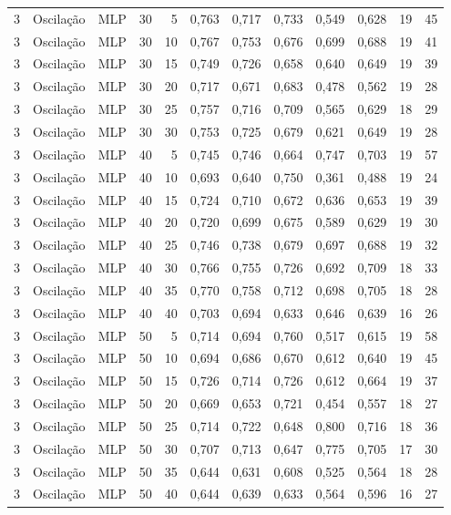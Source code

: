 \begin{longtable}{@{}rllrrrrrrrrr@{}}
3 & Oscilação & MLP & 30 & 5 & 0,763 & 0,717 & 0,733 & 0,549 & 0,628 & 19 & 45 \\
3 & Oscilação & MLP & 30 & 10 & 0,767 & 0,753 & 0,676 & 0,699 & 0,688 & 19 & 41 \\
3 & Oscilação & MLP & 30 & 15 & 0,749 & 0,726 & 0,658 & 0,640 & 0,649 & 19 & 39 \\
3 & Oscilação & MLP & 30 & 20 & 0,717 & 0,671 & 0,683 & 0,478 & 0,562 & 19 & 28 \\
3 & Oscilação & MLP & 30 & 25 & 0,757 & 0,716 & 0,709 & 0,565 & 0,629 & 18 & 29 \\
3 & Oscilação & MLP & 30 & 30 & 0,753 & 0,725 & 0,679 & 0,621 & 0,649 & 19 & 28 \\
3 & Oscilação & MLP & 40 & 5 & 0,745 & 0,746 & 0,664 & 0,747 & 0,703 & 19 & 57 \\
3 & Oscilação & MLP & 40 & 10 & 0,693 & 0,640 & 0,750 & 0,361 & 0,488 & 19 & 24 \\
3 & Oscilação & MLP & 40 & 15 & 0,724 & 0,710 & 0,672 & 0,636 & 0,653 & 19 & 39 \\
3 & Oscilação & MLP & 40 & 20 & 0,720 & 0,699 & 0,675 & 0,589 & 0,629 & 19 & 30 \\
3 & Oscilação & MLP & 40 & 25 & 0,746 & 0,738 & 0,679 & 0,697 & 0,688 & 19 & 32 \\
3 & Oscilação & MLP & 40 & 30 & 0,766 & 0,755 & 0,726 & 0,692 & 0,709 & 18 & 33 \\
3 & Oscilação & MLP & 40 & 35 & 0,770 & 0,758 & 0,712 & 0,698 & 0,705 & 18 & 28 \\
3 & Oscilação & MLP & 40 & 40 & 0,703 & 0,694 & 0,633 & 0,646 & 0,639 & 16 & 26 \\
3 & Oscilação & MLP & 50 & 5 & 0,714 & 0,694 & 0,760 & 0,517 & 0,615 & 19 & 58 \\
3 & Oscilação & MLP & 50 & 10 & 0,694 & 0,686 & 0,670 & 0,612 & 0,640 & 19 & 45 \\
3 & Oscilação & MLP & 50 & 15 & 0,726 & 0,714 & 0,726 & 0,612 & 0,664 & 19 & 37 \\
3 & Oscilação & MLP & 50 & 20 & 0,669 & 0,653 & 0,721 & 0,454 & 0,557 & 18 & 27 \\
3 & Oscilação & MLP & 50 & 25 & 0,714 & 0,722 & 0,648 & 0,800 & 0,716 & 18 & 36 \\
3 & Oscilação & MLP & 50 & 30 & 0,707 & 0,713 & 0,647 & 0,775 & 0,705 & 17 & 30 \\
3 & Oscilação & MLP & 50 & 35 & 0,644 & 0,631 & 0,608 & 0,525 & 0,564 & 18 & 28 \\
3 & Oscilação & MLP & 50 & 40 & 0,644 & 0,639 & 0,633 & 0,564 & 0,596 & 16 & 27 \\

\end{longtable}

